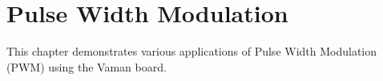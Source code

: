 \chapter{Pulse Width Modulation}
This chapter demonstrates various applications of Pulse Width Modulation (PWM)
using the Vaman board.

